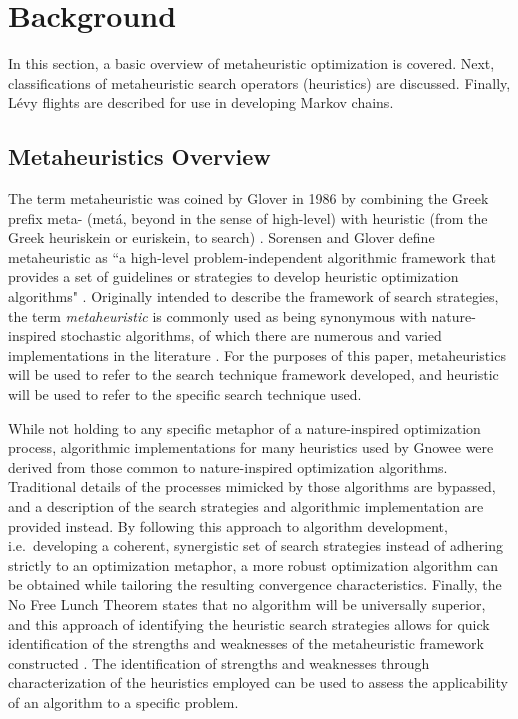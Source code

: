 \documentclass{article}                                                                           %
\begin{document}
\section{Background}
\label{sec:background}
In this section, a basic overview of metaheuristic optimization is covered.
Next, classifications of metaheuristic search operators (heuristics) are discussed.
Finally, Lévy flights are described for use in developing Markov chains.

\subsection{Metaheuristics Overview}
The term metaheuristic was coined by Glover in 1986 by combining the Greek prefix meta- (metá, beyond in the sense of high-level) with heuristic (from the Greek heuriskein or euriskein, to search) \cite{Sorensen2016, Glover1986}.  
Sorensen and Glover define metaheuristic as ``a high-level problem-independent algorithmic framework that provides a set of guidelines or strategies to develop heuristic optimization  algorithms" \cite{Sorensen2016}.
Originally intended to describe the framework of search strategies, the term \textit{metaheuristic} is commonly used as being synonymous with nature-inspired stochastic algorithms, of which there are numerous and varied implementations in the literature \cite{Yang2014, Fister2013}.  
For the purposes of this paper, metaheuristics will be used to refer to the search technique framework developed, and heuristic will be used to refer to the specific search technique used.   

While not holding to any specific metaphor of a nature-inspired optimization process, algorithmic implementations for many heuristics used by Gnowee were derived from those common to nature-inspired optimization algorithms.
Traditional details of the processes mimicked by those algorithms are bypassed, and a description of the search strategies and algorithmic implementation are provided instead.  
By following this approach to algorithm development, i.e.\ developing a coherent, synergistic set of search strategies instead of adhering strictly to an optimization metaphor, a more robust optimization algorithm can be obtained while tailoring the resulting convergence characteristics.  
Finally, the No Free Lunch Theorem states that no algorithm will be universally superior, and this approach of identifying the heuristic search strategies allows for quick identification of the strengths and weaknesses of the metaheuristic framework constructed \cite{Wolpert1997}.
The identification of strengths and weaknesses through characterization of the heuristics employed can be used to assess the applicability of an algorithm to a specific problem.
\end{document}
